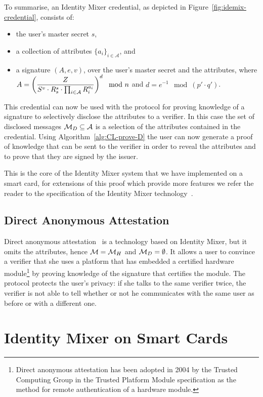 \noindent To summarise, an Identity Mixer credential, as depicted in
Figure~\ref{fig:idemix-credential}, consists of:
\begin{itemize}
  \item the user's master secret $s$,
  \item a collection of attributes $\{a_i\}_{i \in \mathcal{A}}$, and
  \item a signature $(A, e, v)$, over the user's master secret and the attributes, where
    $A = \left(\dfrac{Z}{S^v \cdot R_s^{s} \cdot \prod_{i \in \mathcal{A}} R_i^{a_i}}\right)^d \mod n$
    and $d = e^{-1} \mod (p' \cdot q')$.
\end{itemize}

This credential can now be used with the protocol for proving knowledge of a
signature to selectively disclose the attributes to a verifier. In this case the
set of disclosed messages $\mathcal{M}_D \subseteq \mathcal{A}$ is a selection of the
attributes contained in the credential. Using Algorithm~\ref{alg:CL-prove-D} the
user can now generate a proof of knowledge that can be sent to the verifier in
order to reveal the attributes and to prove that they are signed by the issuer.

This is the core of the Identity Mixer system that we have implemented on a
smart card, for extensions of this proof which provide more features we refer
the reader to the specification of the Identity Mixer
technology~\cite{IdemixCrypto2012}.

\subsection{Direct Anonymous Attestation}

Direct anonymous attestation~\cite{BrickellCC04} is a technology based on
Identity Mixer, but it omits the attributes, hence $\mathcal{M} = \mathcal{M}_H$ and
$\mathcal{M}_D = \emptyset$. It allows a user to convince a verifier that she uses a
platform that has embedded a certified hardware module\footnote{Direct anonymous attestation has been adopted in 2004
by the Trusted Computing Group in the Trusted Platform Module specification as
the method for remote authentication of a hardware module.} by proving knowledge
of the signature that certifies the module. The protocol protects the user's
privacy: if she talks to the same verifier twice, the verifier is not able to
tell whether or not he communicates with the same user as before or with a
different one.

\section{Identity Mixer on Smart Cards}

